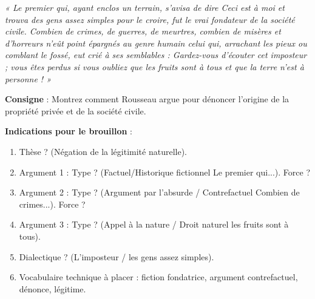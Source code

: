 \documentclass[11pt]{article}
\begin{document}
\begin{exercice}
\textit{« Le premier qui, ayant enclos un terrain, s'avisa de dire \og{}Ceci est à moi\fg{} et trouva des gens assez simples pour le croire, fut le vrai fondateur de la société civile. Combien de crimes, de guerres, de meurtres, combien de misères et d'horreurs n'eût point épargnés au genre humain celui qui, arrachant les pieux ou comblant le fossé, eut crié à ses semblables : \og{}Gardez-vous d'écouter cet imposteur ; vous êtes perdus si vous oubliez que les fruits sont à tous et que la terre n'est à personne !\fg{} »}

\textbf{Consigne} : \og{}Montrez comment Rousseau argue pour dénoncer l'origine de la propriété privée et de la société civile.\fg{}

\textbf{Indications pour le brouillon} :
\begin{enumerate}
    \item Thèse ? (Négation de la légitimité naturelle).
    \item Argument 1 : Type ? (Factuel/Historique fictionnel \og{}Le premier qui...\fg{}). Force ?
    \item Argument 2 : Type ? (Argument par l'absurde / Contrefactuel \og{}Combien de crimes...\fg{}). Force ?
    \item Argument 3 : Type ? (Appel à la nature / Droit naturel \og{}les fruits sont à tous\fg{}).
    \item Dialectique ? (L'imposteur / les \og{}gens assez simples\fg{}).
    \item Vocabulaire technique à placer : \og{}fiction fondatrice\fg{}, \og{}argument contrefactuel\fg{}, \og{}dénonce\fg{}, \og{}légitime\fg{}.
\end{enumerate}
\end{exercice}
\end{document}
